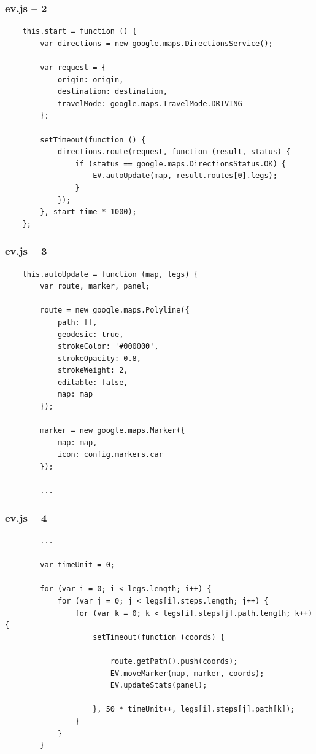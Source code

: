 \begin{frame}[fragile]
\frametitle{ev.js – 2}

\begin{verbatim}
    this.start = function () {
        var directions = new google.maps.DirectionsService();

        var request = {
            origin: origin,
            destination: destination,
            travelMode: google.maps.TravelMode.DRIVING
        };

        setTimeout(function () {
            directions.route(request, function (result, status) {
                if (status == google.maps.DirectionsStatus.OK) {
                    EV.autoUpdate(map, result.routes[0].legs);
                }
            });
        }, start_time * 1000);
    };
\end{verbatim}

\end{frame}
\clearpage



\begin{frame}[fragile]
\frametitle{ev.js – 3}

\begin{verbatim}
    this.autoUpdate = function (map, legs) {
        var route, marker, panel;

        route = new google.maps.Polyline({
            path: [],
            geodesic: true,
            strokeColor: '#000000',
            strokeOpacity: 0.8,
            strokeWeight: 2,
            editable: false,
            map: map
        });

        marker = new google.maps.Marker({
            map: map,
            icon: config.markers.car
        });

        ...
\end{verbatim}

\end{frame}
\clearpage



\begin{frame}[fragile]
\frametitle{ev.js – 4}

\begin{verbatim}
        ...

        var timeUnit = 0;

        for (var i = 0; i < legs.length; i++) {
            for (var j = 0; j < legs[i].steps.length; j++) {
                for (var k = 0; k < legs[i].steps[j].path.length; k++) {
                    setTimeout(function (coords) {

                        route.getPath().push(coords);
                        EV.moveMarker(map, marker, coords);
                        EV.updateStats(panel);

                    }, 50 * timeUnit++, legs[i].steps[j].path[k]);
                }
            }
        }
\end{verbatim}

\end{frame}
\clearpage




